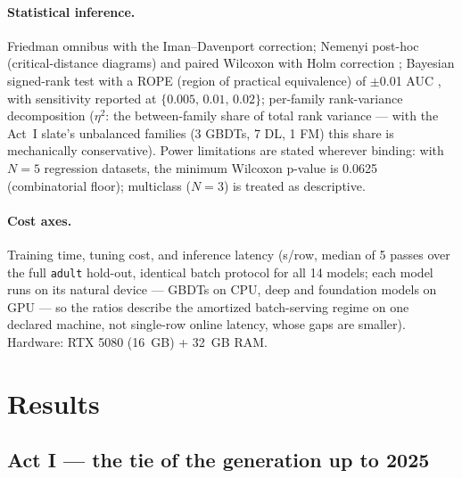 \documentclass[11pt]{article}
\newcommand{\us}{\textmu s}
\begin{document}
\paragraph{Statistical inference.} Friedman omnibus with the
Iman--Davenport correction; Nemenyi post-hoc (critical-distance diagrams)
and paired Wilcoxon with Holm correction \citep{demsar2006}; Bayesian
signed-rank test with a ROPE (region of practical equivalence) of
$\pm$0.01 AUC \citep{benavoli2017}, with sensitivity reported at
$\{0.005,\,0.01,\,0.02\}$; per-family rank-variance decomposition
($\eta^2$: the between-family share of total rank variance --- with the
Act~I slate's unbalanced families (3 GBDTs, 7 DL, 1 FM) this share is
mechanically conservative). Power limitations are stated wherever binding: with $N{=}5$
regression datasets, the minimum Wilcoxon p-value is 0.0625 (combinatorial
floor); multiclass ($N{=}3$) is treated as descriptive.

\paragraph{Cost axes.} Training time, tuning cost, and inference latency
(\us/row, median of 5 passes over the full \texttt{adult} hold-out,
identical batch protocol for all 14 models; each model runs on its natural
device --- GBDTs on CPU, deep and foundation models on GPU --- so the
ratios describe the amortized batch-serving regime on one declared machine,
not single-row online latency, whose gaps are smaller). Hardware: RTX 5080
(16~GB) + 32~GB RAM.

\section{Results}

\subsection{Act I --- the tie of the generation up to 2025}
\end{document}
